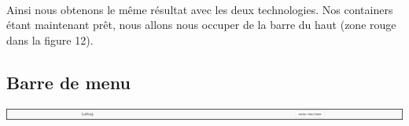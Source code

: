 \documentclass{article}
\begin{document}
\vspace{0.5cm}\\
Ainsi nous obtenons le m\^eme r\'esultat avec les deux technologies. Nos containers \'etant maintenant pr\^et, nous allons nous occuper de la barre du haut (zone rouge dans la figure 12).

\subsection{Barre de menu}

\begin{center}
\vspace{0.5cm}
\includegraphics[width=\textwidth]{p19}
\end{center}
\end{document}
